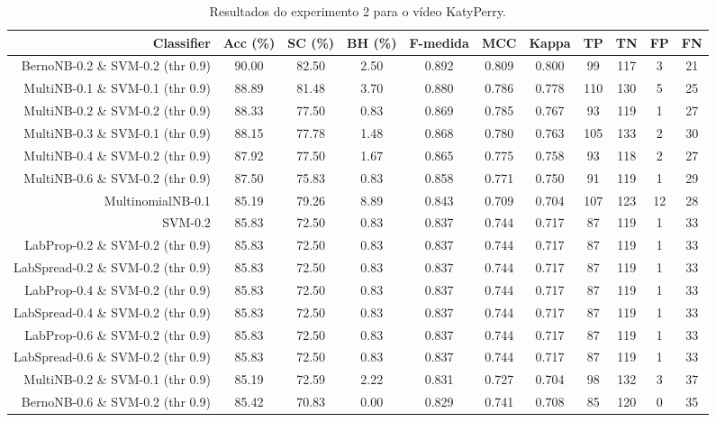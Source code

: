 \begin{table}[!htb]
\centering
\caption{Resultados do experimento 2 para o vídeo KatyPerry.}
\label{tab:KatyPerry}
\begin{tabular}{r|c|c|c|c|c|c|c|c|c|c}
\hline\hline
Classifier & Acc (\%) & SC (\%) & BH (\%) & F-medida & MCC & Kappa & TP & TN & FP & FN \\ \hline
BernoNB-0.2 \& SVM-0.2 (thr 0.9) & 90.00 & 82.50 & 2.50 & 0.892 & 0.809 & 0.800 & 99 & 117 & 3 & 21 \\ 
MultiNB-0.1 \& SVM-0.1 (thr 0.9) & 88.89 & 81.48 & 3.70 & 0.880 & 0.786 & 0.778 & 110 & 130 & 5 & 25 \\ 
MultiNB-0.2 \& SVM-0.2 (thr 0.9) & 88.33 & 77.50 & 0.83 & 0.869 & 0.785 & 0.767 & 93 & 119 & 1 & 27 \\ 
MultiNB-0.3 \& SVM-0.1 (thr 0.9) & 88.15 & 77.78 & 1.48 & 0.868 & 0.780 & 0.763 & 105 & 133 & 2 & 30 \\ 
MultiNB-0.4 \& SVM-0.2 (thr 0.9) & 87.92 & 77.50 & 1.67 & 0.865 & 0.775 & 0.758 & 93 & 118 & 2 & 27 \\ 
MultiNB-0.6 \& SVM-0.2 (thr 0.9) & 87.50 & 75.83 & 0.83 & 0.858 & 0.771 & 0.750 & 91 & 119 & 1 & 29 \\ 
MultinomialNB-0.1 & 85.19 & 79.26 & 8.89 & 0.843 & 0.709 & 0.704 & 107 & 123 & 12 & 28 \\ 
SVM-0.2 & 85.83 & 72.50 & 0.83 & 0.837 & 0.744 & 0.717 & 87 & 119 & 1 & 33 \\ 
LabProp-0.2 \& SVM-0.2 (thr 0.9) & 85.83 & 72.50 & 0.83 & 0.837 & 0.744 & 0.717 & 87 & 119 & 1 & 33 \\ 
LabSpread-0.2 \& SVM-0.2 (thr 0.9) & 85.83 & 72.50 & 0.83 & 0.837 & 0.744 & 0.717 & 87 & 119 & 1 & 33 \\ 
LabProp-0.4 \& SVM-0.2 (thr 0.9) & 85.83 & 72.50 & 0.83 & 0.837 & 0.744 & 0.717 & 87 & 119 & 1 & 33 \\ 
LabSpread-0.4 \& SVM-0.2 (thr 0.9) & 85.83 & 72.50 & 0.83 & 0.837 & 0.744 & 0.717 & 87 & 119 & 1 & 33 \\ 
LabProp-0.6 \& SVM-0.2 (thr 0.9) & 85.83 & 72.50 & 0.83 & 0.837 & 0.744 & 0.717 & 87 & 119 & 1 & 33 \\ 
LabSpread-0.6 \& SVM-0.2 (thr 0.9) & 85.83 & 72.50 & 0.83 & 0.837 & 0.744 & 0.717 & 87 & 119 & 1 & 33 \\ 
MultiNB-0.2 \& SVM-0.1 (thr 0.9) & 85.19 & 72.59 & 2.22 & 0.831 & 0.727 & 0.704 & 98 & 132 & 3 & 37 \\ 
BernoNB-0.6 \& SVM-0.2 (thr 0.9) & 85.42 & 70.83 & 0.00 & 0.829 & 0.741 & 0.708 & 85 & 120 & 0 & 35 \\ 

\end{tabular}
\end{table}
